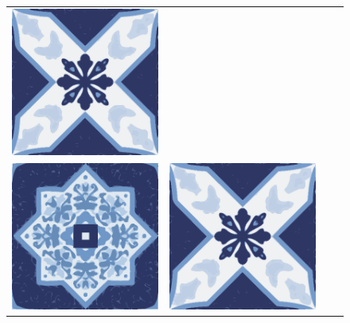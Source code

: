 \documentclass{oci}
\begin{document}
\begin{problemDescription}
\begin{figure}[h]
\begin{center}
{\begin{tabular}{cccc}
        \includegraphics[scale=0.3]{b.eps} \\
        \includegraphics[scale=0.3]{a.eps} &
        \includegraphics[scale=0.3]{b.eps} &

\end{tabular}}
\end{center}
\end{figure}
\end{problemDescription}
\end{document}

